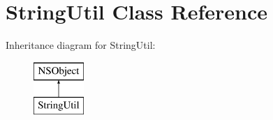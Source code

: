 \hypertarget{interface_string_util}{
\section{\-String\-Util \-Class \-Reference}
\label{interface_string_util}
}
\-Inheritance diagram for \-String\-Util\-:\begin{figure}[H]
\begin{center}
\leavevmode
\includegraphics[height=2.000000cm]{interface_string_util}
\end{center}
\end{figure}
